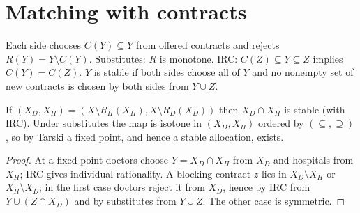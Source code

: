 \section{Matching with contracts}
\label{sec:contracts}

\begin{definition}
\label{def:hm-stable}
\leanok
Each side chooses $C(Y) \subseteq Y$ from offered contracts and rejects $R(Y) = Y \setminus C(Y)$. Substitutes: $R$ is
monotone. IRC: $C(Z) \subseteq Y \subseteq Z$ implies $C(Y) = C(Z)$. $Y$ is stable if both sides choose all of $Y$ and
no nonempty set of new contracts is chosen by both sides from $Y \cup Z$.
\end{definition}

\begin{theorem}
\label{thm:hatfield-milgrom}
\leanok
{}
If $(X_D, X_H) = (X \setminus R_H(X_H), X \setminus R_D(X_D))$ then $X_D \cap X_H$ is stable (with IRC). Under substitutes
the map is isotone in $(X_D, X_H)$ ordered by $(\subseteq, \supseteq)$, so by Tarski a fixed point, and hence a stable
allocation, exists.
\end{theorem}
\begin{proof}
\leanok
At a fixed point doctors choose $Y = X_D \cap X_H$ from $X_D$ and hospitals from $X_H$; IRC gives individual
rationality. A blocking contract $z$ lies in $X_D \setminus X_H$ or $X_H \setminus X_D$; in the first case doctors reject
it from $X_D$, hence by IRC from $Y \cup (Z \cap X_D)$ and by substitutes from $Y \cup Z$. The other case is symmetric.
\end{proof}

